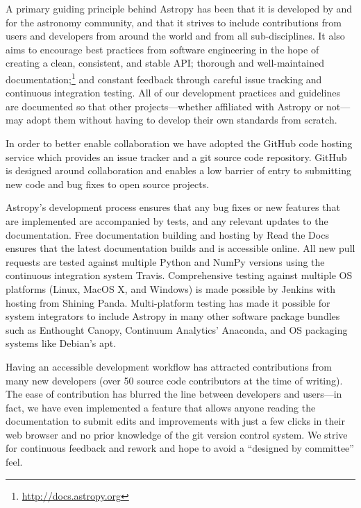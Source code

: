 \documentclass[11pt,twoside]{article}
\begin{document}
A primary guiding principle behind Astropy has been that it is developed by and
for the astronomy community, and that it strives to include contributions from
users and developers from around the world and from all sub-disciplines.  It
also aims to encourage best practices from software engineering in the hope of
creating a clean, consistent, and stable API; thorough and well-maintained
documentation;\footnote{\url{http://docs.astropy.org}} and constant feedback
through careful issue tracking and continuous integration testing.  All of our
development practices and guidelines are documented so that other
projects---whether affiliated with Astropy or not---may adopt them without
having to develop their own standards from scratch.

In order to better enable collaboration we have adopted the GitHub code hosting
service which provides an issue tracker and a git source code repository.
GitHub is designed around collaboration and enables a low barrier of entry to
submitting new code and bug fixes to open source projects.

Astropy's development process ensures that any bug fixes or new features that
are implemented are accompanied by tests, and any relevant updates to the
documentation.  Free documentation building and hosting by Read the Docs
ensures that the latest documentation builds and is accessible online.  All new
pull requests are tested against multiple Python and NumPy versions using the
continuous integration system Travis.  Comprehensive testing against multiple
OS platforms (Linux, MacOS X, and Windows) is made possible by Jenkins with
hosting from Shining Panda.  Multi-platform testing has made it possible for
system integrators to include Astropy in many other software package bundles
such as Enthought Canopy, Continuum Analytics' Anaconda, and OS packaging
systems like Debian's apt.

Having an accessible development workflow has attracted contributions from many
new developers (over 50 source code contributors at the time of writing).  The
ease of contribution has blurred the line between developers and users---in
fact, we have even implemented a feature that allows anyone reading the
documentation to submit edits and improvements with just a few clicks in their
web browser and no prior knowledge of the git version control system.  We
strive for continuous feedback and rework and hope to avoid a ``designed by
committee'' feel.


\end{document}
